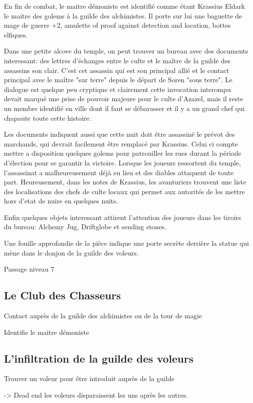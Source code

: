 En fin de combat, le maitre démoniste est identifié comme étant Krassius Eldark
le maitre des golems à la guilde des alchimistes. Il porte sur lui une baguette
de mage de guerre +2, amulette of proof against detection and location, bottes
elfiques.

Dans une petite alcove du temple, on peut trouver un bureau avec des documents 
interessant: des lettres d'échanges entre le culte et le maître de la guilde
des assassins
son clair. C'est cet assassin qui est son principal allié 
et le contact principal avec le maître "sur terre" depuis le départ de Soren  
"sous terre". Le dialogue est quelque peu cryptique et clairement cette invocation
interompu devait marqué une prise de pouvoir majeure pour le culte d'Azazel, mais
il reste un membre identifié en ville dont il faut se débarasser et il y a
un grand chef qui chapaute toute cette histoire. 

Les documents indiquent aussi que cette nuit doit être assassiné le prévot des 
marchands, qui devrait facilement être remplacé par Krassius. Celui ci compte
mettre a disposition quelques golems pour patrouiller les rues durant la période
d'élection pour se garantir la victoire. Lorsque les joueurs ressortent du temple,
l'assassinat a malheureusement déjà eu lieu et des diables attaquent de toute 
part. Heureusement, dans les notes de Krassius, les avanturiers trouvent une liste
des localisations des chefs de culte locaux qui permet aux autorités de les mettre
hors d'etat de nuire en quelques nuits.

Enfin quelques objets interessant attirent l'attention des joueurs dans les tiroirs
du bureau: Alchemy Jug, Driftglobe et sending stones.

Une fouille approfondie de la pièce indique une porte secrète derrière la statue qui 
mène dans le donjon de la guilde des voleurs.

Passage niveau 7

\subsection*{Le Club des Chasseurs}

Contact auprès de la guilde des alchimistes ou de la tour de magie


Identifie le maitre démoniste

\subsection*{L'infiltration de la guilde des voleurs}

Trouver un voleur pour être introduit auprès de la guilde

-> Dead end les voleurs disparaissent les uns après les autres.


